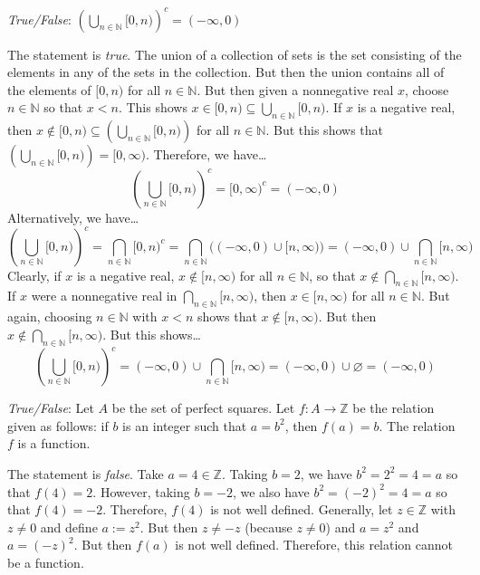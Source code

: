 \documentclass[11pt,letterpaper]{article}
\begin{document}
\newpage



\quizsol \textit{True/False}: $\displaystyle \left( \bigcup_{n \in \mathbb{N}} [0, n) \right)^c= (-\infty, 0)$ \pspace

\sol The statement is \textit{true}. The union of a collection of sets is the set consisting of the elements in any of the sets in the collection. But then the union contains all of the elements of $[0, n)$ for all $n \in \mathbb{N}$. But then given a nonnegative real $x$, choose $n \in \mathbb{N}$ so that $x < n$. This shows $x \in [0, n) \subseteq \displaystyle \bigcup_{n \in \mathbb{N}} [0, n)$. If $x$ is a negative real, then $x \notin [0, n) \subseteq \displaystyle \left( \bigcup_{n \in \mathbb{N}} [0, n) \right)$ for all $n \in \mathbb{N}$. But this shows that $\displaystyle \left( \bigcup_{n \in \mathbb{N}} [0, n) \right)= [0, \infty)$. Therefore, we have\dots
	\[
	\displaystyle \left( \bigcup_{n \in \mathbb{N}} [0, n) \right)^c= [0, \infty)^c= (-\infty, 0)
	\]
Alternatively, we have\dots
	\[
	\displaystyle \left( \bigcup_{n \in \mathbb{N}} [0, n) \right)^c= \bigcap_{n \in \mathbb{N}} [0, n)^c= \bigcap_{n \in \mathbb{N}} \bigg( (-\infty, 0) \cup [n, \infty) \bigg)= (-\infty, 0) \cup \bigcap_{n \in \mathbb{N}} [n, \infty)
	\]
Clearly, if $x$ is a negative real, $x \notin [n, \infty)$ for all $n \in \mathbb{N}$, so that $x \notin \displaystyle \bigcap_{n \in \mathbb{N}} [n, \infty)$. If $x$ were a nonnegative real in $\displaystyle \bigcap_{n \in \mathbb{N}} [n, \infty)$, then $x \in [n, \infty)$ for all $n \in \mathbb{N}$. But again, choosing $n \in \mathbb{N}$ with $x < n$ shows that $x \notin [n, \infty)$. But then $x \notin \displaystyle \bigcap_{n \in \mathbb{N}} [n, \infty)$. But this shows\dots 
	\[
	\displaystyle \left( \bigcup_{n \in \mathbb{N}} [0, n) \right)^c= (-\infty, 0) \cup \bigcap_{n \in \mathbb{N}} [n, \infty)= (-\infty, 0) \cup \varnothing= (-\infty, 0)
	\] \pvspace{1.3cm}



\quizsol \textit{True/False}: Let $A$ be the set of perfect squares. Let $f: A \to \mathbb{Z}$ be the relation given as follows: if $b$ is an integer such that $a= b^2$, then $f(a)= b$. The relation $f$ is a function. \pspace

\sol The statement is \textit{false}. Take $a= 4 \in \mathbb{Z}$. Taking $b= 2$, we have $b^2= 2^2= 4= a$ so that $f(4)= 2$. However, taking $b= -2$, we also have $b^2= (-2)^2= 4= a$ so that $f(4)= -2$. Therefore, $f(4)$ is not well defined. Generally, let $z \in \mathbb{Z}$ with $z \neq 0$ and define $a:= z^2$. But then $z \neq -z$ (because $z \neq 0$) and $a= z^2$ and $a= (-z)^2$. But then $f(a)$ is not well defined. Therefore, this relation cannot be a function. \pvspace{1.3cm}
\end{document}
